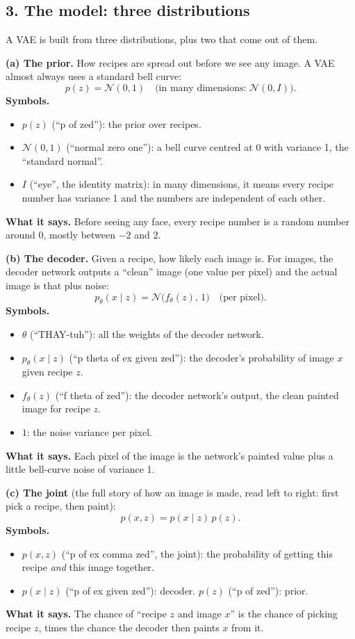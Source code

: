 \subsection*{3. The model: three distributions}

A VAE is built from three distributions, plus two that come out of them.

\textbf{(a) The prior.} How recipes are spread out before we see any image. A VAE almost always uses a standard bell curve:
\[
p(z) = \mathcal{N}(0, 1) \quad \text{(in many dimensions: } \mathcal{N}(0, I)\text{).}
\]
\textbf{Symbols.}
\begin{itemize}[leftmargin=1.5em, itemsep=0pt]
\item $p(z)$ (``p of zed''): the prior over recipes.
\item $\mathcal{N}(0, 1)$ (``normal zero one''): a bell curve centred at 0 with variance 1, the ``standard normal''.
\item $I$ (``eye'', the identity matrix): in many dimensions, it means every recipe number has variance 1 and the numbers are independent of each other.
\end{itemize}
\textbf{What it says.} Before seeing any face, every recipe number is a random number around 0, mostly between $-2$ and $2$.

\textbf{(b) The decoder.} Given a recipe, how likely each image is. For images, the decoder network outputs a ``clean'' image (one value per pixel) and the actual image is that plus noise:
\[
p_\theta(x \mid z) = \mathcal{N}\big(f_\theta(z),\, 1\big) \quad \text{(per pixel).}
\]
\textbf{Symbols.}
\begin{itemize}[leftmargin=1.5em, itemsep=0pt]
\item $\theta$ (``THAY-tuh''): all the weights of the decoder network.
\item $p_\theta(x \mid z)$ (``p theta of ex given zed''): the decoder's probability of image $x$ given recipe $z$.
\item $f_\theta(z)$ (``f theta of zed''): the decoder network's output, the clean painted image for recipe $z$.
\item $1$: the noise variance per pixel.
\end{itemize}
\textbf{What it says.} Each pixel of the image is the network's painted value plus a little bell-curve noise of variance 1.

\textbf{(c) The joint} (the full story of how an image is made, read left to right: first pick a recipe, then paint):
\[
p(x, z) = p(x \mid z)\, p(z).
\]
\textbf{Symbols.}
\begin{itemize}[leftmargin=1.5em, itemsep=0pt]
\item $p(x, z)$ (``p of ex comma zed'', the joint): the probability of getting this recipe \emph{and} this image together.
\item $p(x \mid z)$ (``p of ex given zed''): decoder. $p(z)$ (``p of zed''): prior.
\end{itemize}
\textbf{What it says.} The chance of ``recipe $z$ and image $x$'' is the chance of picking recipe $z$, times the chance the decoder then paints $x$ from it.

